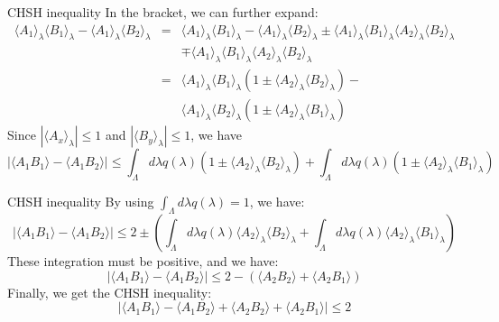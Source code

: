 \documentclass{beamer}
\begin{document}
    \begin{frame}{CHSH inequality}
        In the bracket, we can further expand:
        \begin{eqnarray}
            \langle  A_1\rangle_\lambda\langle B_1\rangle_\lambda - \langle  A_1\rangle_\lambda\langle B_2\rangle_\lambda &=& \langle  A_1\rangle_\lambda\langle B_1\rangle_\lambda - \langle  A_1\rangle_\lambda\langle B_2\rangle_\lambda \pm 
            \langle  A_1\rangle_\lambda\langle B_1\rangle_\lambda\langle  A_2\rangle_\lambda\langle B_2\rangle_\lambda \nonumber \\
            &&\mp\langle  A_1\rangle_\lambda\langle B_1\rangle_\lambda\langle  A_2\rangle_\lambda\langle B_2\rangle_\lambda \nonumber \\
            &=& \langle  A_1\rangle_\lambda\langle B_1\rangle_\lambda\left(1 \pm \langle  A_2\rangle_\lambda\langle B_2\rangle_\lambda\right) - \nonumber \\
            && \langle  A_1\rangle_\lambda\langle B_2\rangle_\lambda\left(1 \pm \langle  A_2\rangle_\lambda\langle B_1\rangle_\lambda\right) \nonumber
        \end{eqnarray}
        Since $|\langle A_x\rangle_\lambda|\leq 1$ and $|\langle B_y\rangle_\lambda|\leq 1$, we have 
        \begin{equation*}
                |\langle A_1B_1\rangle - \langle A_1B_2\rangle| \leq \int_\Lambda d\lambda q(\lambda) \left(1 \pm \langle  A_2\rangle_\lambda\langle B_2\rangle_\lambda\right) + \int_\Lambda d\lambda q(\lambda) \left(1 \pm \langle  A_2\rangle_\lambda\langle B_1\rangle_\lambda\right)
        \end{equation*}

    \end{frame}

    \begin{frame}{CHSH inequality}
        By using $\int_\Lambda d\lambda q(\lambda)=1$, we have:
        \begin{equation*}
            |\langle A_1B_1\rangle - \langle A_1B_2\rangle| \leq 2 \pm \left(\int_\Lambda d\lambda q(\lambda) \langle  A_2\rangle_\lambda\langle B_2\rangle_\lambda + \int_\Lambda d\lambda q(\lambda) \langle  A_2\rangle_\lambda\langle B_1\rangle_\lambda \right)
        \end{equation*}
        These integration must be positive, and we have:
        \begin{equation*}
            |\langle A_1B_1\rangle - \langle A_1B_2\rangle| \leq 2 - \left(\langle A_2B_2\rangle + \langle A_2B_1\rangle\right)
        \end{equation*}
        Finally, we get the CHSH inequality:
        \begin{equation*}
            |\langle A_1B_1\rangle - \langle A_1B_2\rangle + \langle A_2B_2\rangle + \langle A_2B_1\rangle| \leq 2
        \end{equation*}
        \begin{center}
            \footnotesize {}
        \end{center}
    \end{frame}
\end{document}
